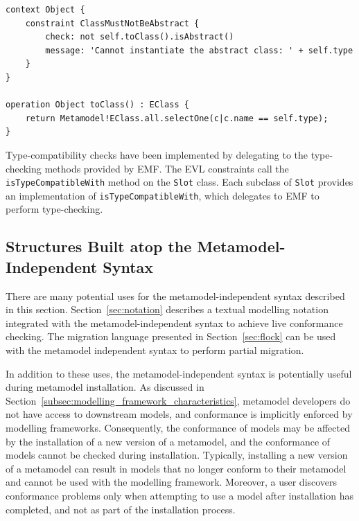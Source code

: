\begin{lstlisting}[caption=A constraint (in EVL) to check that only concrete metamodel types are instantiated., label=lst:conformance_constraint, language=EVL]
context Object {
	constraint ClassMustNotBeAbstract {
		check: not self.toClass().isAbstract()
		message: 'Cannot instantiate the abstract class: ' + self.type
	}
}

operation Object toClass() : EClass {
	return Metamodel!EClass.all.selectOne(c|c.name == self.type);
}
\end{lstlisting}

Type-compatibility checks have been implemented by delegating to the type-checking methods provided by EMF. The EVL constraints call the \texttt{isTy\-peCo\-mp\-at\-ib\-leWi\-th} method on the \texttt{Sl\-ot} class. Each subclass of \texttt{Sl\-ot} provides an implementation of \texttt{isTy\-peCo\-mp\-at\-ib\-leWi\-th}, which delegates to EMF to perform type-checking.


\subsection{Structures Built atop the Metamodel-Independent Syntax}
There are many potential uses for the metamodel-independent syntax described in this section. Section~\ref{sec:notation} describes a textual modelling notation integrated with the metamodel-independent syntax to achieve live conformance checking. The migration language presented in Section~\ref{sec:flock} can be used with the metamodel independent syntax to perform partial migration.

In addition to these uses, the metamodel-independent syntax is potentially useful during metamodel installation. As discussed in Section~\ref{subsec:modelling_framework_characteristics}, metamodel developers do not have access to downstream models, and conformance is implicitly enforced by modelling frameworks. Consequently, the conformance of models may be affected by the installation of a new version of a metamodel, and the conformance of models cannot be checked during installation. Typically, installing a new version of a metamodel can result in models that no longer conform to their metamodel and cannot be used with the modelling framework. Moreover, a user discovers conformance problems only when attempting to use a model after installation has completed, and not as part of the installation process.

